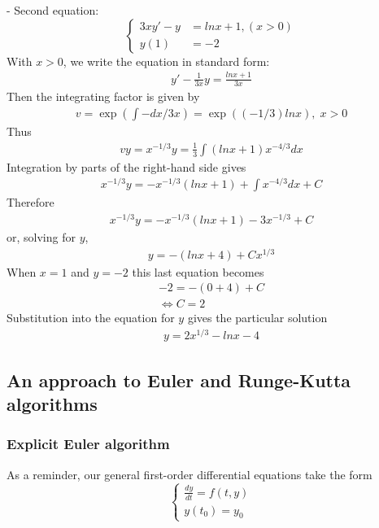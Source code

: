 \documentclass[a4paper]{article}
\begin{document}
- Second equation:
\begin{equation*}
  \begin{cases}
    3xy' - y & = lnx + 1, (x > 0) \\
    y(1)     & = -2
  \end{cases}
\end{equation*}
With \(x > 0\), we write the equation in standard form:
\begin{align*}
  y' - \frac{1}{3x}y = \frac{lnx + 1}{3x}
\end{align*}
Then the integrating factor is given by
\begin{align*}
  v = \exp \left(\int -dx/3x\right) = \exp((-1/3)lnx), \;x > 0
\end{align*}
Thus
\begin{align*}
  vy = x^{-1/3} y = \frac{1}{3} \int(lnx + 1) x^{-4/3} dx
\end{align*}
Integration by parts of the right-hand side gives
\begin{align*}
  x^{-1/3}y = -x^{-1/3}(lnx+1) + \int x^{-4/3}dx + C
\end{align*}
Therefore
\begin{align*}
  x^{-1/3}y = -x^{-1/3}(lnx+1) - 3x^{-1/3} + C
\end{align*}
or, solving for \(y\),
\begin{align*}
  y = -(lnx + 4) + Cx^{1/3}
\end{align*}
When \(x = 1\) and \(y = -2\) this last equation becomes
\begin{align*}
  -2 = -(0+4) + C \\
  \Leftrightarrow C = 2
\end{align*}
Substitution into the equation for \(y\) gives the particular solution
\begin{align*}
  y = 2x^{1/3} - lnx - 4
\end{align*}


\subsection{An approach to Euler and Runge-Kutta algorithms}
\subsubsection{Explicit Euler algorithm}\label{sssec:explicit_euler}
As a reminder, our general first-order differential equations take the form
\begin{equation*}
  \begin{cases}
    \frac{dy}{dt} = f(t,y) \\
    y(t_0) = y_0
  \end{cases}
\end{equation*}
\end{document}
